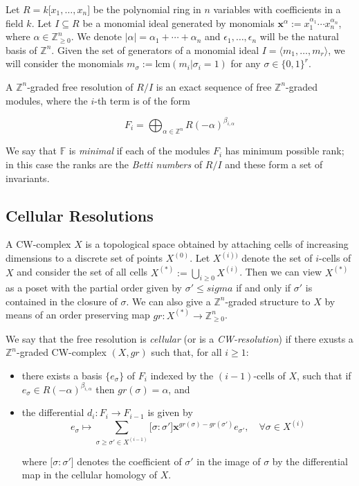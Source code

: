 \documentclass[paper=a4, fontsize=11pt]{scrartcl} %
\theoremstyle{plain}
\theoremstyle{definition}
\begin{document}
Let $R = k \lbrack x_1, \dots, x_n \rbrack$ be the polynomial ring in $n$ variables with coefficients in a field $k$. Let $I \subseteq R$ be a monomial ideal generated by monomials $\mathbf{x}^{\alpha} := x_{1}^{\alpha_{1}} \cdots x_{n}^{\alpha_{n}}$, where $\alpha \in \mathbb{Z}^{n}_{\geq 0}$. We denote $\vert \alpha \vert = \alpha_1 + \cdots + \alpha_n$ and $\epsilon_1,\dots, \epsilon_n$ will be the natural basis of $\mathbb{Z}^n$. Given the set of generators of a monomial ideal $I = \langle m_1, \dots, m_r \rangle$, we will consider the monomials $m_{\sigma} := \text{lcm} (m_i \vert \sigma_i = 1 )$ for any $\sigma \in \lbrace 0, 1 \rbrace^r$.

A $\mathbb{Z}^n$-graded free resolution of $R/I$ is an exact sequence of free $\mathbb{Z}^n$-graded modules, where the $i$-th term is of the form

$$F_i = \bigoplus_{\alpha \in \mathbb{Z}^n} R(-\alpha)^{\beta_{i,\alpha}}$$

We say that $\mathbb{F}$ is \textit{minimal} if each of the modules $F_i$ has minimum possible rank; in this case the ranks are the \textit{Betti numbers} of $R/I$ and these form a set of invariants.


\subsection{Cellular Resolutions}
A CW-complex $X$ is a topological space obtained by attaching cells of increasing dimensions to a discrete set of points $X^{(0)}$. Let $X^{(i))}$ denote the set of $i$-cells of $X$ and consider the set of all cells $X^{(\ast)} := \bigcup_{i\geq 0} X^{(i)}$. Then we can view $X^{(\ast)}$ as a poset with the partial order given by $\sigma ' \leq sigma$ if and only if $\sigma '$ is contained in the closure of $\sigma$. We can also give a $\mathbb{Z}^n$-graded structure to $X$ by means of an order preserving map $gr: X^{(\ast)} \longrightarrow \mathbb{Z}^{n}_{\geq 0}$.

We say that the free resolution is \textit{cellular} (or is a \textit{CW-resolution}) if there exusts a $\mathbb{Z}^n$-graded CW-complex $(X,gr)$ such that, for all $i \geq 1$:

\begin{itemize}
\item there exists a basis $\lbrace e_{\sigma} \rbrace$ of $F_i$ indexed by the $(i-1)$-cells of $X$, such that if $e_{\sigma} \in R(-\alpha)^{\beta_{i,\alpha}}$ then $gr(\sigma) = \alpha$, and
\item the differential $d_i: F_i \longrightarrow F_{i-1}$ is given by $$e_{\sigma} \mapsto \sum_{\sigma \geq \sigma ' \in X^{(i-1)}} \lbrack \sigma : \sigma' \rbrack \mathbf{x}^{gr(\sigma) - gr(\sigma ')} e_{\sigma '}, \quad \forall \sigma \in X^{(i)}$$

where $\lbrack \sigma : \sigma' \rbrack$ denotes the coefficient of $\sigma '$ in the image of $\sigma$ by the differential map in the cellular homology of $X$.
\end{itemize}
\end{document}
